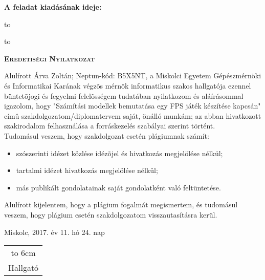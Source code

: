 \noindent\textbf{A feladat kiadásának ideje:}\newline


\vskip 2cm

\hbox to 

\hbox to 

\newpage

\vspace*{1cm}  
\begin{center}
\large\textsc{\bfseries Eredetiségi Nyilatkozat}
\end{center}
\vspace*{2cm}  

Alulírott Árva Zoltán; Neptun-kód: B5X5NT, a Miskolci Egyetem Gépészmérnöki és Informatikai Karának végzõs mérnök informatikus szakos hallgatója ezennel büntetõjogi és fegyelmi felelõsségem tudatában nyilatkozom és aláírásommal igazolom, hogy "Számítási modellek bemutatása egy FPS játék készítése kapcsán" címû szakdolgozatom/diplomatervem saját, önálló munkám; az abban hivatkozott szakirodalom
felhasználása a forráskezelés szabályai szerint történt.\\

Tudomásul veszem, hogy szakdolgozat esetén plágiumnak számít:
\begin{itemize}
\item szószerinti idézet közlése idézõjel és hivatkozás megjelölése nélkül;
\item tartalmi idézet hivatkozás megjelölése nélkül;
\item más publikált gondolatainak saját gondolatként való feltüntetése.
\end{itemize}

Alulírott kijelentem, hogy a plágium fogalmát megismertem, és tudomásul veszem, hogy
plágium esetén szakdolgozatom visszautasításra kerül.

\vspace*{3cm}

\noindent Miskolc, 2017. év 11. hó 24. nap

\vspace*{3cm}

\hspace*{8cm}\begin{tabular}{c}
\hbox to 6cm{\dotfill}\\
Hallgató
\end{tabular}
